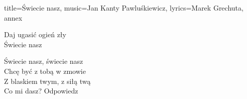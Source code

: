 \begin{song}{title={Świecie nasz}, music={Jan Kanty Pawluśkiewicz}, lyrics={Marek Grechuta}, annex}
\begin{multicols}{2}
\begin{chorus}
        Daj ugasić ogień zły \\
        Świecie nasz
    \end{chorus}
    \begin{outro}
        Świecie nasz, świecie nasz \\
        Chcę być z tobą w zmowie \\
        Z blaskiem twym, z siłą twą \\
        Co mi dasz? Odpowiedz
    \end{outro}
\end{multicols}
\end{song}

